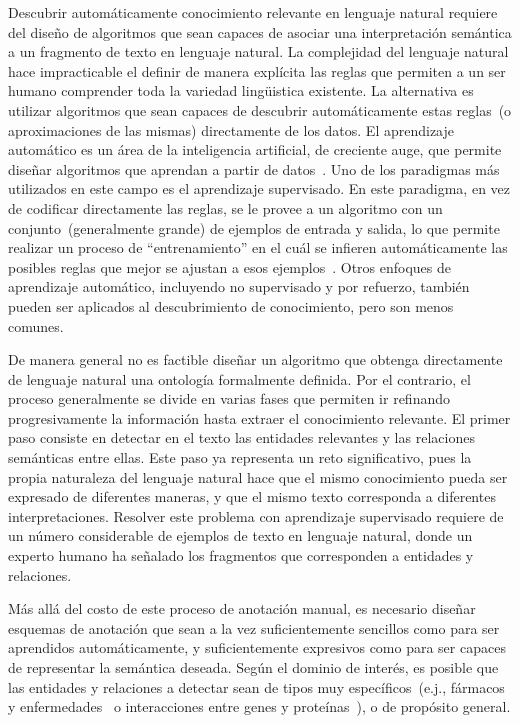 Descubrir automáticamente conocimiento relevante en lenguaje natural requiere del diseño de algoritmos que sean capaces de asociar una interpretación semántica a un fragmento de texto en lenguaje natural.
La complejidad del lenguaje natural hace impracticable el definir de manera explícita las reglas que permiten a un ser humano comprender toda la variedad lingüistica existente.
La alternativa es utilizar algoritmos que sean capaces de descubrir automáticamente estas reglas~(o aproximaciones de las mismas) directamente de los datos.
El aprendizaje automático es un área de la inteligencia artificial, de creciente auge, que permite diseñar algoritmos que aprendan a partir de datos~\cite{mitchel_ml}.
Uno de los paradigmas más utilizados en este campo es el aprendizaje supervisado.
En este paradigma, en vez de codificar directamente las reglas, se le provee a un algoritmo con un conjunto~(generalmente grande) de ejemplos de entrada y salida, lo que permite realizar un proceso de ``entrenamiento'' en el cuál se infieren automáticamente las posibles reglas que mejor se ajustan a esos ejemplos~\cite{murphy_ml}.
Otros enfoques de aprendizaje automático, incluyendo no supervisado y por refuerzo, también pueden ser aplicados al descubrimiento de conocimiento, pero son menos comunes.

De manera general no es factible diseñar un algoritmo que obtenga directamente de lenguaje natural una ontología formalmente definida.
Por el contrario, el proceso generalmente se divide en varias fases que permiten ir refinando progresivamente la información hasta extraer el conocimiento relevante.
El primer paso consiste en detectar en el texto las entidades relevantes y las relaciones semánticas entre ellas.
Este paso ya representa un reto significativo, pues la propia naturaleza del lenguaje natural hace que el mismo conocimiento pueda ser expresado de diferentes maneras, y que el mismo texto corresponda a diferentes interpretaciones.
Resolver este problema con aprendizaje supervisado requiere de un número considerable de ejemplos de texto en lenguaje natural, donde un experto humano ha señalado los fragmentos que corresponden a entidades y relaciones.

Más allá del costo de este proceso de anotación manual, es necesario diseñar esquemas de anotación que sean a la vez suficientemente sencillos como para ser aprendidos automáticamente, y suficientemente expresivos como para ser capaces de representar la semántica deseada.
Según el dominio de interés, es posible que las entidades y relaciones a detectar sean de tipos muy específicos~(e.j., fármacos y enfermedades~\cite{goldberg1996drug} o interacciones entre genes y proteínas~\cite{tanabe2005genetag}),
o de propósito general.

